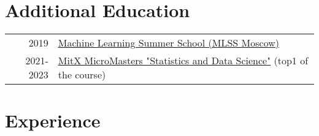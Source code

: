 \documentclass[unicode,a4paper,10pt]{article}
\begin{document}
\section{Additional Education}
\begin{tabular}{rl}
	2019 & \href{https://smiles.skoltech.ru/mlss2019}{Machine Learning Summer School (MLSS Moscow)} \\
	2021-2023 & \href{https://courses.edx.org/dashboard/programs/fa06b9c5-fe2b-41d8-a8c1-1bfd9c0d7b07/}{MitX MicroMasters "Statistics and Data Science"} (top1 of the course)
\end{tabular}
\section{Experience}
\begin{tabular}{r p{13cm}}


\end{tabular}
\end{document}

